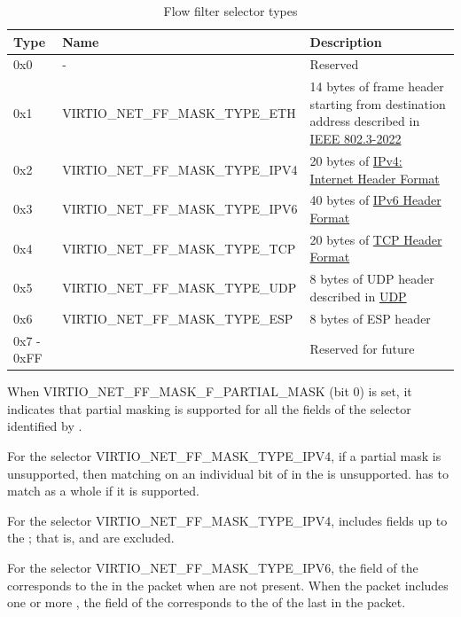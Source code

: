 \begin{table}[H]
\caption{Flow filter selector types}
\label{table:Device Types / Network Device / Device Operation / Flow filter / Device and driver capabilities / VIRTIO-NET-FF-SELECTOR-CAP / flow filter selector types}
\begin{tabularx}{\textwidth}{ |l|X|X| }
\hline
Type & Name & Description \\
\hline \hline
0x0 & - & Reserved \\
\hline
0x1 & VIRTIO_NET_FF_MASK_TYPE_ETH & 14 bytes of frame header starting from destination address described in \hyperref[intro:IEEE 802.3-2022]{IEEE 802.3-2022} \\
\hline
0x2 & VIRTIO_NET_FF_MASK_TYPE_IPV4 & 20 bytes of \hyperref[intro:Internet-Header-Format]{IPv4: Internet Header Format} \\
\hline
0x3 & VIRTIO_NET_FF_MASK_TYPE_IPV6 & 40 bytes of \hyperref[intro:IPv6-Header-Format]{IPv6 Header Format} \\
\hline
0x4 & VIRTIO_NET_FF_MASK_TYPE_TCP & 20 bytes of \hyperref[intro:TCP-Header-Format]{TCP Header Format} \\
\hline
0x5 & VIRTIO_NET_FF_MASK_TYPE_UDP & 8 bytes of UDP header described in \hyperref[intro:UDP]{UDP} \\
\hline
0x6 & VIRTIO_NET_FF_MASK_TYPE_ESP & 8 bytes of ESP header \\
\hline
0x7 - 0xFF & & Reserved for future \\
\hline
\end{tabularx}
\end{table}

When VIRTIO_NET_FF_MASK_F_PARTIAL_MASK (bit 0) is set, it indicates that
partial masking is supported for all the fields of the selector identified by .

For the selector  VIRTIO_NET_FF_MASK_TYPE_IPV4, if a partial mask is unsupported,
then matching on an individual bit of  in the
 is unsupported.  has to match as a whole
if it is supported.

For the selector  VIRTIO_NET_FF_MASK_TYPE_IPV4,  includes fields
up to the ; that is,  and
 are excluded.

For the selector  VIRTIO_NET_FF_MASK_TYPE_IPV6, the  field
of the  corresponds to the  in the packet
when  are not present. When the packet includes
one or more , the  field of
the  corresponds to the  of the last
 in the packet.

